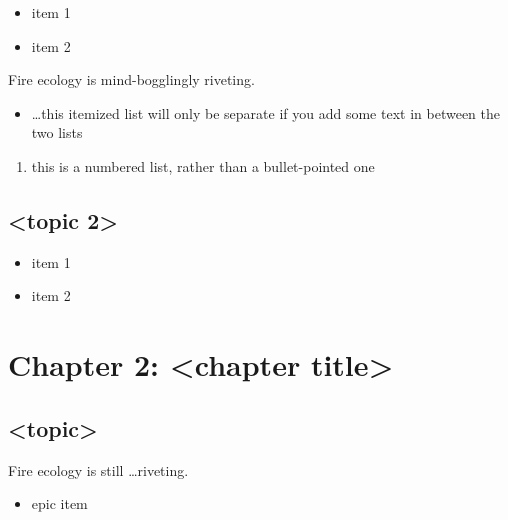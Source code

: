 \documentclass[a4paper]{article}
\begin{document}
\begin{itemize}
    \item item 1
    \item item 2
\end{itemize}

\raggedright Fire ecology is mind-bogglingly riveting.

\begin{itemize}
    \item \dots this itemized list will only be separate if you add some text in between the two lists
\end{itemize}

\begin{enumerate}
    \item this is a numbered list, rather than a bullet-pointed one
\end{enumerate}

\subsection{<topic 2>}

\begin{itemize}
    \item item 1
    \item item 2
\end{itemize}


\section{Chapter 2: <chapter title>}

\subsection{<topic>}
Fire ecology is still \dots riveting.
\begin{itemize}
    \item epic item
\end{itemize}
\end{document}
